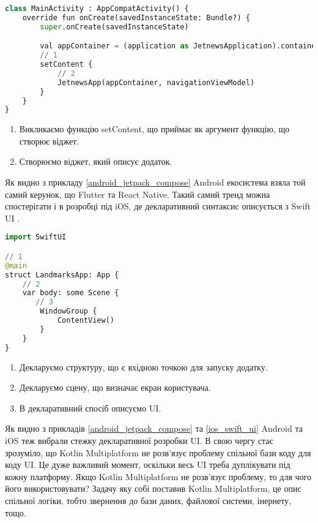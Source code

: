 \begin{lstlisting}[style=light, language=Python,label={lst:android_jetpack_compose},caption=Android Jetpack Compose]
class MainActivity : AppCompatActivity() {
    override fun onCreate(savedInstanceState: Bundle?) {
        super.onCreate(savedInstanceState)

        val appContainer = (application as JetnewsApplication).container
        // 1
        setContent {
            // 2
            JetnewsApp(appContainer, navigationViewModel)
        }
    }
}
\end{lstlisting}

\begin{enumerate}
    \item Викликаємо функцію setContent, що приймає як аргумент функцію, що створює віджет.
    \item Створюємо віджет, який описує додаток.
\end{enumerate}

Як видно з прикладу \ref{android_jetpack_compose} Android екосистема взяла той самий керунок, що Flutter та React Native.
Такий самий тренд можна спостерігати і в розробці під iOS, де декларативний синтаксис описується з Swift UI \cite{swift_ui}.

\begin{lstlisting}[style=light, language=Python,label={lst:ios_swift_ui},caption=Swift UI]
import SwiftUI

// 1
@main
struct LandmarksApp: App {
    // 2
    var body: some Scene {
       // 3
        WindowGroup {
            ContentView()
        }
    }
}
\end{lstlisting}

\begin{enumerate}
    \item Декларуємо структуру, що є вхідною точкою для запуску додатку.
    \item Декларуємо сцену, що визначає екран користувача.
    \item В декларативний спосіб описуємо UI.
\end{enumerate}

Як видно з прикладів \ref{android_jetpack_compose} та \ref{ios_swift_ui} Android та iOS теж вибрали стежку декларативної розробки UI.
В свою чергу стає зрозуміло, що Kotlin Multiplatform не розв'язує проблему спільної бази коду для коду UI.
Це дуже важливий момент, оскільки весь UI треба дуплікувати під кожну платформу.
Якщо Kotlin Multiplatform не розв'язує проблему, то для чого його використовувати?
Задачу яку собі поставив Kotlin Multiplatform, це опис спільної логіки, тобто звернення до бази даних, файлової системи, інернету, тощо.


